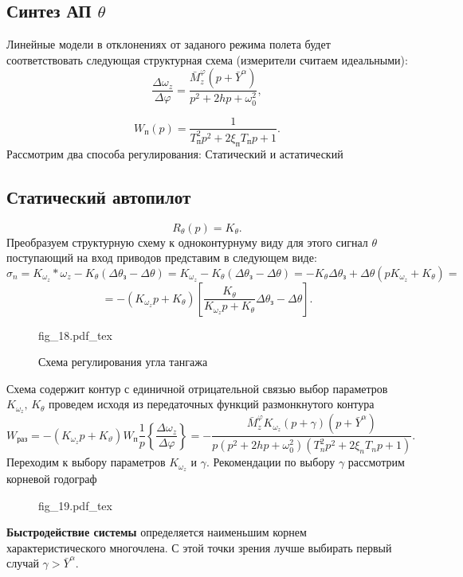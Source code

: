 \documentclass{article}
\begin{document}
\subsection{Синтез АП $\theta$}
Линейные модели в отклонениях от заданого режима полета будет соответствовать следующая структурная схема (измерители считаем идеальными):
\[
	\frac{\Delta \omega_z}{\Delta \varphi} = \frac{\bar{M}_z^\varphi (p+\bar{Y}^\alpha)}{p^2 + 2hp + \omega_{0}^2},
\]

\[
	W_\text{п}(p) = \frac{1}{T_\text{п}^2 p^2 + 2 \xi_\text{п} T_\text{п} p + 1}.
\]
Рассмотрим два способа регулирования: 
Статический и астатический\\
\subsection{Статический автопилот}
\[
	R_{\theta}(p)= K_\theta.
\]
Преобразуем структурную схему к одноконтурнуму виду для этого сигнал $\theta$ поступающий на вход приводов представим в следующем виде: 
\[
	\sigma_n = K_{\omega_z}*\omega_z - K_\theta (\Delta \theta_\text{з} - \Delta \theta) = K_{\omega_z} - K_{\theta}(\Delta \theta_\text{з} - \Delta \theta) = -K_{\theta} \Delta \theta_\text{з} + \Delta \theta(p K_{\omega_z} + K_{\theta}) =
\]
\[
	= -(K_{\omega_z}p + K_\theta)[\frac{K_\theta}{K_{\omega_z}p + K_{\theta}}\Delta\theta_\text{з} - \Delta \theta].
\]

\begin{figure}[ht]
	\centering
	{fig_18.pdf_tex}
	\caption{Схема регулирования угла тангажа}
	\label{fig:18}
\end{figure}

Схема содержит контур с единичной отрицательной связью выбор параметров $K_{\omega_z}, \, K_{\theta}$ проведем исходя из передаточных функций размонкнутого контура
\[
	W_\text{раз} = -(K_{\omega_z} p + K_\vartheta) W_\text{п} \frac{1}{p}\left\{{\frac{\Delta \omega_z}{\Delta \varphi}}\right\} = -\frac{\bar{M}_z^\varphi K_{\omega_{z}}(p + \gamma)(p + \bar{Y}^\alpha)}{p(p^2 + 2hp + \omega_0^2)(T_n^2 p^2 + 2 \xi_n T_n p +1)}.
\]
Переходим к выбору параметров $K_{\omega_z}$ и $\gamma$.
Рекомендации по выбору $\gamma$ рассмотрим корневой годограф 

\begin{figure}[H]
	\centering
	{fig_19.pdf_tex}
\end{figure}

\textbf{Быстродействие системы} определяется наименьшим корнем характеристического многочлена.
С этой точки зрения лучше выбирать первый случай $\gamma > \bar{Y}^\alpha$.\\
\end{document}

